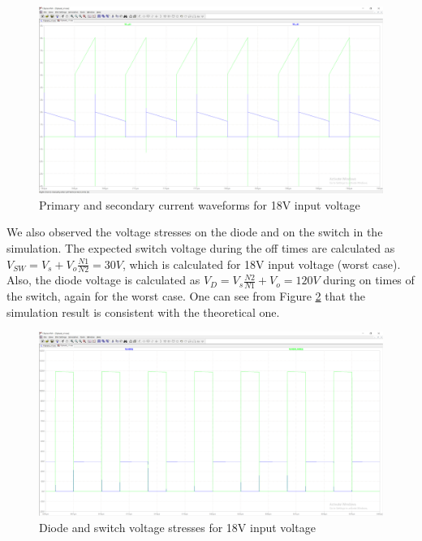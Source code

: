 \documentclass[12pt]{article}
\begin{document}
    \begin{figure}[H]
        \centering
        \includegraphics[scale=0.3]{img/Spice_Sim/Ideal/ideal_Lm_ripples_18V.PNG}
        \caption{Primary and secondary current waveforms for 18V input voltage}
        \label{fig:ideal_Lm_ripples_18V}
    \end{figure}

    We also observed the voltage stresses on the diode and on the switch in the simulation. The expected switch voltage during the off times are calculated as $V_{SW} = V_s + V_o\frac{N1}{N2} = 30V$, which is calculated for 18V input voltage (worst case). Also, the diode voltage is calculated as $V_D = V_s\frac{N2}{N1}+V_o = 120V$ during on times of the switch, again for the worst case. One can see from Figure \ref{fig:ideal_V_stress} that the simulation result is consistent with the theoretical one. \\

    \begin{figure}[H]
        \centering
        \includegraphics[scale=0.3]{img/Spice_Sim/Ideal/ideal_diode_switch_stresses_Vs_18V.PNG}
        \caption{Diode and switch voltage stresses for 18V input voltage}
        \label{fig:ideal_V_stress}
    \end{figure}
\end{document}
